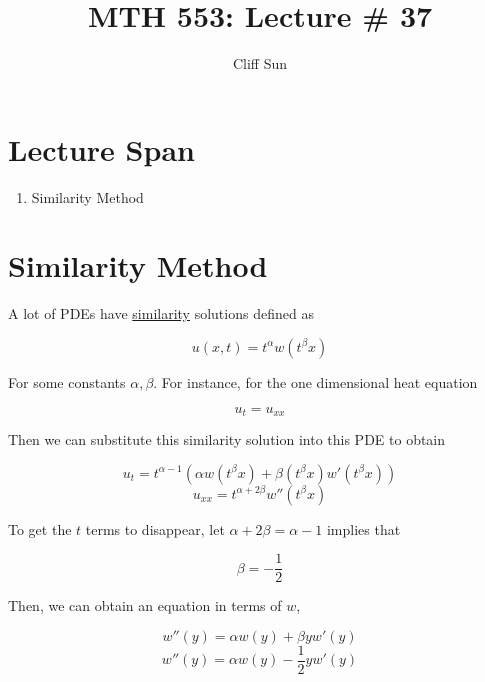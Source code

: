 \documentclass{article}
\title{MTH 553: Lecture \# 37}
\author{Cliff Sun}
\newtheorem{one minute paper}[theorem]{One Minute Paper}
\begin{document}
\maketitle

\section*{Lecture Span}
\begin{enumerate}
    \item Similarity Method
\end{enumerate}

\section*{Similarity Method}

A lot of PDEs have \underline{similarity} solutions defined as 

\begin{equation}
    u(x,t) = t^{\alpha}w(t^{\beta} x)
\end{equation}

For some constants $\alpha, \beta$. For instance, for the one dimensional heat equation 

\begin{equation}
    u_t = u_{xx}
\end{equation}

Then we can substitute this similarity solution into this PDE to obtain 

\begin{equation}
    u_t = t^{\alpha - 1}\left( \alpha w(t^{\beta}x) + \beta(t^{\beta}x)w'(t^{\beta}x) \right)
\end{equation}
\begin{equation}
    u_{xx} = t^{\alpha + 2\beta}w''(t^{\beta}x)
\end{equation}

To get the $t$ terms to disappear, let $\alpha + 2\beta = \alpha -1$ implies that 

\begin{equation}
    \beta = -\frac{1}{2}
\end{equation}

Then, we can obtain an equation in terms of $w$, 

\begin{equation}
    w''(y) = \alpha w(y) + \beta yw'(y)
\end{equation}
\begin{equation}
    w''(y) = \alpha w(y) - \frac{1}{2} yw'(y)
\end{equation}
\end{document}
